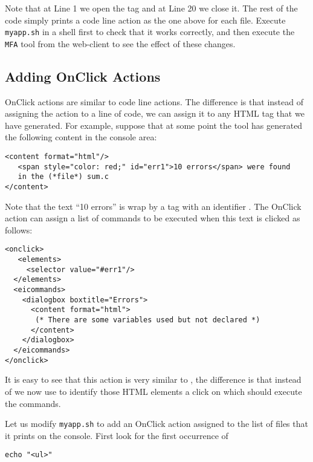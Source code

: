 \medskip
\noindent
Note that at Line 1 we open the tag  and at Line 20 we
close it. The rest of the code simply prints a code line action as the
one above for each file.
%
Execute \texttt{myapp.sh} in a shell first to check that it works
correctly, and then execute the \texttt{MFA} tool from the
web-client to see the effect of these changes.

\subsection{Adding OnClick Actions}

OnClick actions are similar to code line actions. The difference is
that instead of assigning the action to a line of code, we can assign
it to any HTML tag that we have generated.
%
For example, suppose that at some point the tool has generated
the following content in the console area:

\medskip
\begin{lstlisting}
<content format="html"/>
   <span style="color: red;" id="err1">10 errors</span> were found 
   in the (*file*) sum.c
</content>
\end{lstlisting}

\medskip
\noindent
Note that the text ``10 errors'' is wrap by a  tag with an
identifier . The OnClick action can assign a list of
commands to be executed when this text is clicked as follows:

\begin{lstlisting}
<onclick>
   <elements>
     <selector value="#err1"/>
  </elements>
  <eicommands>
    <dialogbox boxtitle="Errors"> 
      <content format="html">
       (* There are some variables used but not declared *)
      </content>
    </dialogbox>
  </eicommands>
</onclick>
\end{lstlisting}

\medskip
\noindent
It is easy to see that this action is very similar to
, the difference is that instead of  we
now use  to identify those HTML elements a click on
which should execute the commands. 

Let us modify \texttt{myapp.sh} to add an OnClick action assigned to
the list of files that it prints on the console. First look for the
first occurrence of

\medskip
\begin{lstlisting}[style=script]
echo "<ul>"
\end{lstlisting}

